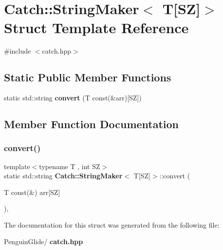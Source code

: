 \section{Catch\+::String\+Maker$<$ T[SZ]$>$ Struct Template Reference}
\label{struct_catch_1_1_string_maker_3_01_t[_s_z]_4}


{\ttfamily \#include $<$catch.\+hpp$>$}

\subsection*{Static Public Member Functions}
\begin{DoxyCompactItemize}
\item 
static std\+::string \textbf{ convert} (T const(\&arr)[SZ])
\end{DoxyCompactItemize}


\subsection{Member Function Documentation}
\mbox{\label{struct_catch_1_1_string_maker_3_01_t[_s_z]_4_a3698cea2c24d8649ec9ecb5fa679eeb7}} 
\subsubsection{convert()}
{\footnotesize\ttfamily template$<$typename T , int SZ$>$ \\
static std\+::string \textbf{ Catch\+::\+String\+Maker}$<$ T[SZ]$>$\+::convert (\begin{DoxyParamCaption}\item[{T const(\&)}]{arr[\+S\+Z] }\end{DoxyParamCaption})\hspace{0.3cm}{\ttfamily [inline]}, {\ttfamily [static]}}



The documentation for this struct was generated from the following file\+:\begin{DoxyCompactItemize}
\item 
Penguin\+Glide/\textbf{ catch.\+hpp}\end{DoxyCompactItemize}
